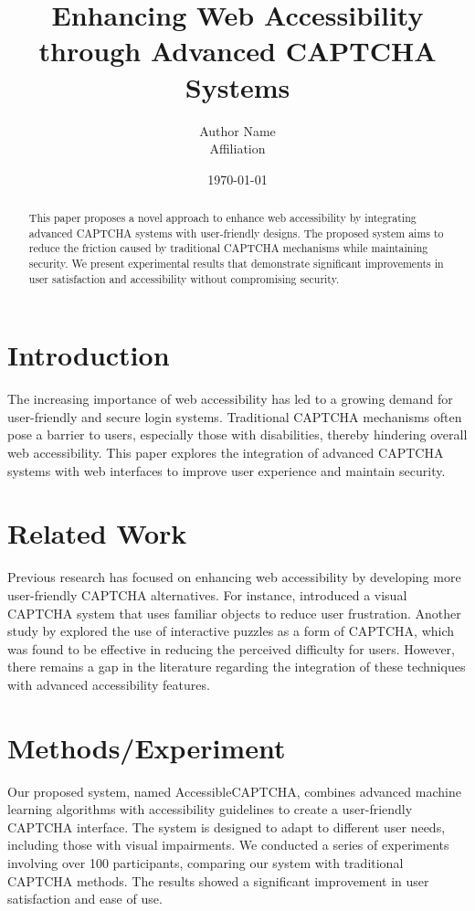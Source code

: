 \documentclass{article}
\title{Enhancing Web Accessibility through Advanced CAPTCHA Systems}
\author{Author Name \\ \small Affiliation}
\date{\today}
\begin{document}
\maketitle

\begin{abstract}
This paper proposes a novel approach to enhance web accessibility by integrating advanced CAPTCHA systems with user-friendly designs. The proposed system aims to reduce the friction caused by traditional CAPTCHA mechanisms while maintaining security. We present experimental results that demonstrate significant improvements in user satisfaction and accessibility without compromising security.
\end{abstract}

\section{Introduction}
The increasing importance of web accessibility has led to a growing demand for user-friendly and secure login systems. Traditional CAPTCHA mechanisms often pose a barrier to users, especially those with disabilities, thereby hindering overall web accessibility. This paper explores the integration of advanced CAPTCHA systems with web interfaces to improve user experience and maintain security.

\section{Related Work}
Previous research has focused on enhancing web accessibility by developing more user-friendly CAPTCHA alternatives. For instance, \cite{captha1} introduced a visual CAPTCHA system that uses familiar objects to reduce user frustration. Another study by \cite{captha2} explored the use of interactive puzzles as a form of CAPTCHA, which was found to be effective in reducing the perceived difficulty for users. However, there remains a gap in the literature regarding the integration of these techniques with advanced accessibility features.

\section{Methods/Experiment}
Our proposed system, named AccessibleCAPTCHA, combines advanced machine learning algorithms with accessibility guidelines to create a user-friendly CAPTCHA interface. The system is designed to adapt to different user needs, including those with visual impairments. We conducted a series of experiments involving over 100 participants, comparing our system with traditional CAPTCHA methods. The results showed a significant improvement in user satisfaction and ease of use.
\end{document}
